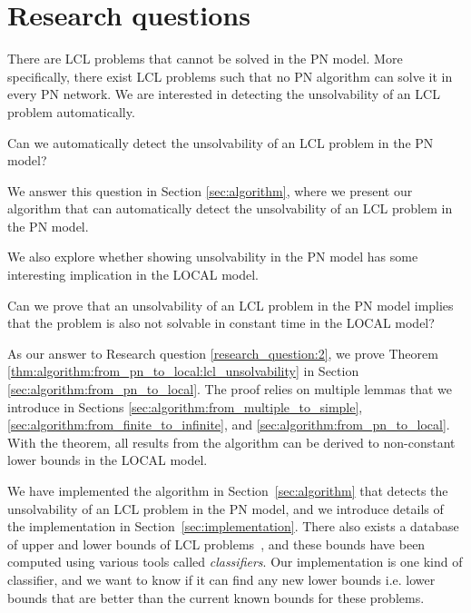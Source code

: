 
\section{Research questions} \label{sec:research_question}

There are LCL problems that cannot be solved in the PN model.
More specifically, there exist LCL problems such that no PN algorithm can solve it in every PN network.
We are interested in detecting the unsolvability of an LCL problem automatically.

\begin{researchquestion} \label{research_question:1}
Can we automatically detect the unsolvability of an LCL problem in the PN model?
\end{researchquestion}

We answer this question in Section \ref{sec:algorithm}, where we present our algorithm that can automatically detect the unsolvability of an LCL problem in the PN model.

We also explore whether showing unsolvability in the PN model has some interesting implication in the LOCAL model.

\begin{researchquestion} \label{research_question:2}
Can we prove that an unsolvability of an LCL problem in the PN model implies that the problem is also not solvable in constant time in the LOCAL model?
\end{researchquestion}

As our answer to Research question \ref{research_question:2}, we prove Theorem \ref{thm:algorithm:from_pn_to_local:lcl_unsolvability} in Section \ref{sec:algorithm:from_pn_to_local}.
The proof relies on multiple lemmas that we introduce in Sections \ref{sec:algorithm:from_multiple_to_simple}, \ref{sec:algorithm:from_finite_to_infinite}, and \ref{sec:algorithm:from_pn_to_local}.
With the theorem, all results from the algorithm can be derived to non-constant lower bounds in the LOCAL model.

We have implemented the algorithm in Section~\ref{sec:algorithm} that detects the unsolvability of an LCL problem in the PN model, and we introduce details of the implementation in Section~\ref{sec:implementation}.
There also exists a database of upper and lower bounds of LCL problems~\cite{Tereshchenko2021}, and these bounds have been computed using various tools called \emph{classifiers}.
Our implementation is one kind of classifier, and we want to know if it can find any new lower bounds i.e. lower bounds that are better than the current known bounds for these problems.

